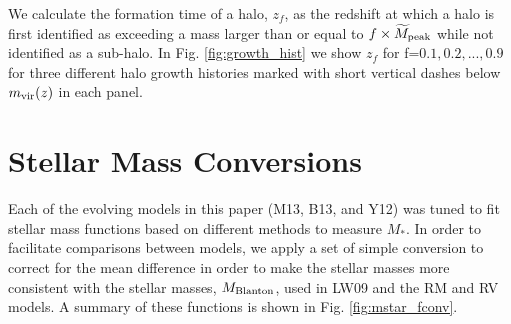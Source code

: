 \documentclass[a4paper,fleqn,usenatbib]{mnras}
\begin{document}
We calculate the formation time of a halo, $z_{f}$, as the redshift at which a halo is first identified as exceeding a mass larger than or equal to $f \times \widetilde{M}_{\rm peak}$ while not identified as a sub-halo.  In Fig. \ref{fig:growth_hist} we show $z_f$ for f=$0.1,0.2,...,0.9$ for three different halo growth histories marked with short vertical dashes below $m_{\rm vir}(z)$ in each panel.   



\section{Stellar Mass Conversions}
\label{appendix:stellar_mass_conv}

Each of the evolving models in this paper (M13, B13, and Y12) was tuned to fit stellar mass functions based on different methods to measure $M_*$.  In order to facilitate comparisons between models, we apply a set of simple conversion to correct for the mean difference in order to make the stellar masses more consistent with the \citet{Blanton:2007cv} stellar masses, $M_{\rm Blanton}$, used in LW09 and the RM and RV models.  A summary of these functions is shown in Fig. \ref{fig:mstar_fconv}.
\end{document}

